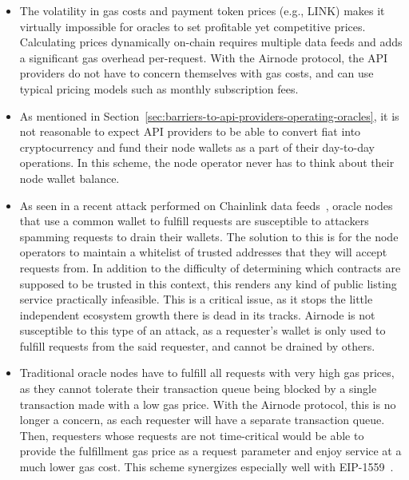 \documentclass[11pt]{article}
\begin{document}
\begin{itemize}
    \item The volatility in gas costs and payment token prices (e.g., LINK) makes it virtually impossible for oracles to set profitable yet competitive prices.
    Calculating prices dynamically on-chain requires multiple data feeds and adds a significant gas overhead per-request.
    With the Airnode protocol, the API providers do not have to concern themselves with gas costs, and can use typical pricing models such as monthly subscription fees.
    \item As mentioned in Section~\ref{sec:barriers-to-api-providers-operating-oracles}, it is not reasonable to expect API providers to be able to convert fiat into cryptocurrency and fund their node wallets as a part of their day-to-day operations.
    In this scheme, the node operator never has to think about their node wallet balance.
    \item As seen in a recent attack performed on Chainlink data feeds~\cite{chainlink-gastoken}, oracle nodes that use a common wallet to fulfill requests are susceptible to attackers spamming requests to drain their wallets.
    The solution to this is for the node operators to maintain a whitelist of trusted addresses that they will accept requests from.
    In addition to the difficulty of determining which contracts are supposed to be trusted in this context, this renders any kind of public listing service practically infeasible.
    This is a critical issue, as it stops the little independent ecosystem growth there is dead in its tracks.
    Airnode is not susceptible to this type of an attack, as a requester's wallet is only used to fulfill requests from the said requester, and cannot be drained by others.
    \item Traditional oracle nodes have to fulfill all requests with very high gas prices, as they cannot tolerate their transaction queue being blocked by a single transaction made with a low gas price.
    With the Airnode protocol, this is no longer a concern, as each requester will have a separate transaction queue.
    Then, requesters whose requests are not time-critical would be able to provide the fulfillment gas price as a request parameter and enjoy service at a much lower gas cost.
    This scheme synergizes especially well with EIP-1559~\cite{eip1559}.
\end{itemize}
\end{document}
